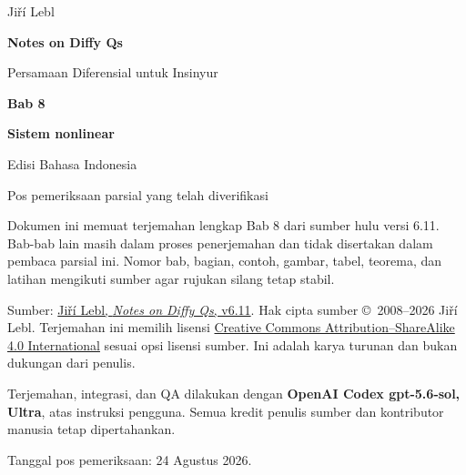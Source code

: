 \documentclass[12pt]{article}
\begin{document}
\begin{center}
\vspace*{18mm}
{\Large Ji\v{r}\'i Lebl\par}
\vspace{13mm}
{\Huge\bfseries Notes on Diffy Qs\par}
\vspace{3mm}
{\LARGE Persamaan Diferensial untuk Insinyur\par}
\vspace{18mm}
{\Huge\bfseries Bab 8\par}
\vspace{3mm}
{\Huge\bfseries Sistem nonlinear\par}
\vspace{13mm}
{\Large Edisi Bahasa Indonesia\par}
\vspace{3mm}
{\large Pos pemeriksaan parsial yang telah diverifikasi\par}
\end{center}

\vfill

\begin{center}
\begin{minipage}{0.82\textwidth}
\small
Dokumen ini memuat terjemahan lengkap Bab 8 dari sumber hulu versi 6.11.
Bab-bab lain masih dalam proses penerjemahan dan tidak disertakan dalam
pembaca parsial ini. Nomor bab, bagian, contoh, gambar, tabel, teorema, dan
latihan mengikuti sumber agar rujukan silang tetap stabil.

\medskip
Sumber: \href{https://github.com/jirilebl/diffyqs/releases/tag/v6.11}%
{Ji\v{r}\'i Lebl, \emph{Notes on Diffy Qs}, v6.11}.
Hak cipta sumber \copyright\ 2008--2026 Ji\v{r}\'i Lebl.
Terjemahan ini memilih lisensi
\href{https://creativecommons.org/licenses/by-sa/4.0/}%
{Creative Commons Attribution--ShareAlike 4.0 International} sesuai opsi
lisensi sumber. Ini adalah karya turunan dan bukan dukungan dari penulis.

\medskip
Terjemahan, integrasi, dan QA dilakukan dengan
\textbf{OpenAI Codex gpt-5.6-sol, Ultra}, atas instruksi pengguna. Semua
kredit penulis sumber dan kontributor manusia tetap dipertahankan.

\medskip
Tanggal pos pemeriksaan: 24 Agustus 2026.
\end{minipage}
\end{center}
\vspace*{10mm}
\end{document}
